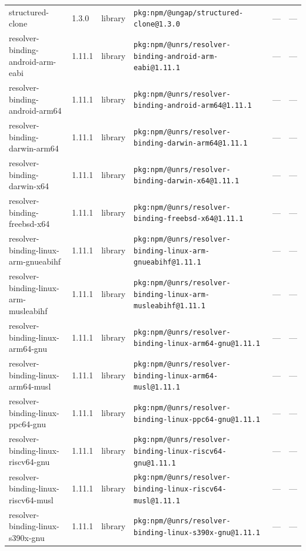 \documentclass[11pt,a4paper]{article}
\begin{document}
\begin{longtable}{|p{4cm}|p{2cm}|p{1.6cm}|p{5cm}|p{1.5cm}|p{3.5cm}|}
\raggedright structured-clone & 1.3.0 & library & \small\texttt{pkg:npm/@ungap/structured-clone@1.3.0} & — & \small — \\
\raggedright resolver-binding-android-arm-eabi & 1.11.1 & library & \small\texttt{pkg:npm/@unrs/resolver-binding-android-arm-eabi@1.11.1} & — & \small — \\
\raggedright resolver-binding-android-arm64 & 1.11.1 & library & \small\texttt{pkg:npm/@unrs/resolver-binding-android-arm64@1.11.1} & — & \small — \\
\raggedright resolver-binding-darwin-arm64 & 1.11.1 & library & \small\texttt{pkg:npm/@unrs/resolver-binding-darwin-arm64@1.11.1} & — & \small — \\
\raggedright resolver-binding-darwin-x64 & 1.11.1 & library & \small\texttt{pkg:npm/@unrs/resolver-binding-darwin-x64@1.11.1} & — & \small — \\
\raggedright resolver-binding-freebsd-x64 & 1.11.1 & library & \small\texttt{pkg:npm/@unrs/resolver-binding-freebsd-x64@1.11.1} & — & \small — \\
\raggedright resolver-binding-linux-arm-gnueabihf & 1.11.1 & library & \small\texttt{pkg:npm/@unrs/resolver-binding-linux-arm-gnueabihf@1.11.1} & — & \small — \\
\raggedright resolver-binding-linux-arm-musleabihf & 1.11.1 & library & \small\texttt{pkg:npm/@unrs/resolver-binding-linux-arm-musleabihf@1.11.1} & — & \small — \\
\raggedright resolver-binding-linux-arm64-gnu & 1.11.1 & library & \small\texttt{pkg:npm/@unrs/resolver-binding-linux-arm64-gnu@1.11.1} & — & \small — \\
\raggedright resolver-binding-linux-arm64-musl & 1.11.1 & library & \small\texttt{pkg:npm/@unrs/resolver-binding-linux-arm64-musl@1.11.1} & — & \small — \\
\raggedright resolver-binding-linux-ppc64-gnu & 1.11.1 & library & \small\texttt{pkg:npm/@unrs/resolver-binding-linux-ppc64-gnu@1.11.1} & — & \small — \\
\raggedright resolver-binding-linux-riscv64-gnu & 1.11.1 & library & \small\texttt{pkg:npm/@unrs/resolver-binding-linux-riscv64-gnu@1.11.1} & — & \small — \\
\raggedright resolver-binding-linux-riscv64-musl & 1.11.1 & library & \small\texttt{pkg:npm/@unrs/resolver-binding-linux-riscv64-musl@1.11.1} & — & \small — \\
\raggedright resolver-binding-linux-s390x-gnu & 1.11.1 & library & \small\texttt{pkg:npm/@unrs/resolver-binding-linux-s390x-gnu@1.11.1} & — & \small — \\

\end{longtable}
\end{document}
